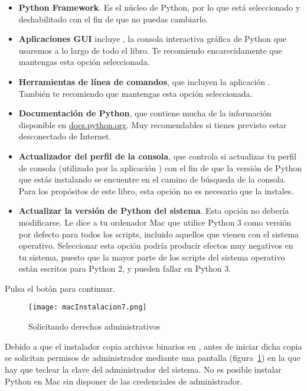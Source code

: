 \begin{itemize}
\item \textbf{Python Framework}. Es el núcleo de Python, por lo que está seleccionado y deshabilitado con el fin de que no puedas cambiarlo.
\item \textbf{Aplicaciones GUI} incluye , la consola interactiva gráfica de Python que usaremos a lo largo de todo el libro. Te recomiendo encarecidamente que mantengas esta opción seleccionada.
\item \textbf{Herramientas de línea de comandos}, que incluyen la aplicación . También te recomiendo que mantengas esta opción seleccionada.
\item \textbf{Documentación de Python}, que contiene mucha de la información disponible en \href{http://docs.python.org/}{docs.python.org}. Muy recomendables si tienes previsto estar desconectado de Internet.
\item \textbf{Actualizador del perfil de la consola}, que controla si actualizas tu perfil de consola (utilizado por la aplicación ) con el fin de que la versión de Python que estás instalando se encuentre en el camino de búsqueda de la consola. Para los propósitos de este libro, esta opción no es necesario que la instales.
\item \textbf{Actualizar la versión de Python del sistema}. Esta opción no debería modificarse. Le dice a tu ordenador Mac que utilice Python 3 como versión por defecto para todos los scripts, incluido aquellos que vienen con el sistema operativo. Seleccionar esta opción podría producir efectos muy negativos en tu sistema, puesto que la mayor parte de los scripts del sistema operativo están escritos para Python 2, y pueden fallar en Python 3.
\end{itemize}

Pulsa el botón  para continuar.

\begin{figure}[!h]
  \begin{center}
\texttt{[image: macInstalacion7.png]}
\caption{Solicitando derechos administrativos}\label{figm07}
  \end{center}
\end{figure}

Debido a que el instalador copia archivos binarios en , antes de iniciar dicha copia se solicitan permisos de administrador mediante una pantalla (figura~\ref{figm07}) en la que hay que teclear la clave del administrador del sistema. No es posible instalar Python en Mac sin disponer de las credenciales de administrador.

